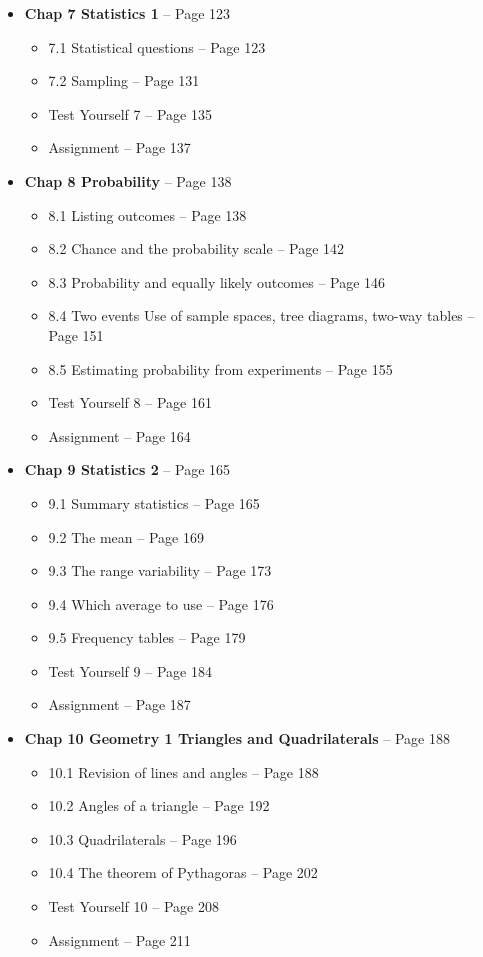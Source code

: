 \documentclass{article}
\begin{document}
\begin{itemize}
    \item \textbf{Chap 7 Statistics 1} -- Page 123
    \begin{itemize}
        \item 7.1 Statistical questions -- Page 123
        \item 7.2 Sampling -- Page 131
        \item Test Yourself 7 -- Page 135
        \item Assignment -- Page 137
    \end{itemize}

    \item \textbf{Chap 8 Probability} -- Page 138
    \begin{itemize}
        \item 8.1 Listing outcomes -- Page 138
        \item 8.2 Chance and the probability scale -- Page 142
        \item 8.3 Probability and equally likely outcomes -- Page 146
        \item 8.4 Two events Use of sample spaces, tree diagrams, two-way tables -- Page 151
        \item 8.5 Estimating probability from experiments -- Page 155
        \item Test Yourself 8 -- Page 161
        \item Assignment -- Page 164
    \end{itemize}

    \item \textbf{Chap 9 Statistics 2} -- Page 165
    \begin{itemize}
        \item 9.1 Summary statistics -- Page 165
        \item 9.2 The mean -- Page 169
        \item 9.3 The range variability -- Page 173
        \item 9.4 Which average to use -- Page 176
        \item 9.5 Frequency tables -- Page 179
        \item Test Yourself 9 -- Page 184
        \item Assignment -- Page 187
    \end{itemize}

    \item \textbf{Chap 10 Geometry 1 Triangles and Quadrilaterals} -- Page 188
    \begin{itemize}
        \item 10.1 Revision of lines and angles -- Page 188
        \item 10.2 Angles of a triangle -- Page 192
        \item 10.3 Quadrilaterals -- Page 196
        \item 10.4 The theorem of Pythagoras -- Page 202
        \item Test Yourself 10 -- Page 208
        \item Assignment -- Page 211
    \end{itemize}


\end{itemize}
\end{document}
